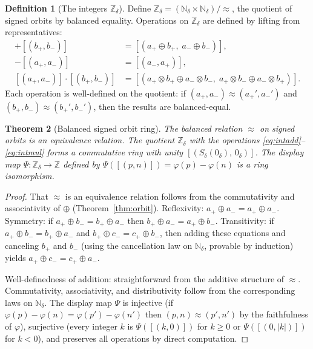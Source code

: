 \documentclass[11pt,a4paper]{article}
\newtheorem{theorem}{Theorem}[section]
\theoremstyle{definition}
\newtheorem{definition}[theorem]{Definition}
\theoremstyle{remark}
\begin{document}
\begin{definition}[The integers $\mathbb{Z}_\delta$]\label{def:prcint}
Define $\mathbb{Z}_\delta = (\mathbb{N}_\delta \times \mathbb{N}_\delta)
/ {\approx}$, the quotient of signed orbits by balanced equality. Operations
on $\mathbb{Z}_\delta$ are defined by lifting from representatives:
\begin{align}
  [(a_+, a_-)] + [(b_+, b_-)] &= [(a_+ \oplus b_+,\; a_- \oplus b_-)],
    \label{eq:intadd} \\
  -[(a_+, a_-)] &= [(a_-, a_+)], \label{eq:intneg} \\
  [(a_+, a_-)] \cdot [(b_+, b_-)] &= [(a_+ \otimes b_+ \oplus a_- \otimes
    b_-,\; a_+ \otimes b_- \oplus a_- \otimes b_+)]. \label{eq:intmul}
\end{align}
Each operation is well-defined on the quotient: if $(a_+, a_-) \approx
(a_+', a_-')$ and $(b_+, b_-) \approx (b_+', b_-')$, then the results are
balanced-equal.
\end{definition}

\begin{theorem}[Balanced signed orbit ring]\label{thm:int}
The balanced relation $\approx$ on signed orbits is an equivalence relation.
The quotient $\mathbb{Z}_\delta$ with the operations
\eqref{eq:intadd}--\eqref{eq:intmul} forms a commutative ring with unity
$[(S_\delta(0_\delta),\, 0_\delta)]$. The display map
$\Psi : \mathbb{Z}_\delta \to \mathbb{Z}$ defined by
$\Psi([(p,n)]) = \varphi(p) - \varphi(n)$ is a ring isomorphism.
\end{theorem}

\begin{proof}
That $\approx$ is an equivalence relation follows from the commutativity and
associativity of $\oplus$ (Theorem~\ref{thm:orbit}). Reflexivity:
$a_+ \oplus a_- = a_+ \oplus a_-$. Symmetry: if
$a_+ \oplus b_- = b_+ \oplus a_-$ then $b_+ \oplus a_- = a_+ \oplus b_-$.
Transitivity: if $a_+ \oplus b_- = b_+ \oplus a_-$ and
$b_+ \oplus c_- = c_+ \oplus b_-$, then adding these equations and canceling
$b_+$ and $b_-$ (using the cancellation law on $\mathbb{N}_\delta$, provable
by induction) yields $a_+ \oplus c_- = c_+ \oplus a_-$.

Well-definedness of addition: straightforward from the additive structure
of $\approx$. Commutativity, associativity, and distributivity follow from
the corresponding laws on $\mathbb{N}_\delta$. The display map $\Psi$ is
injective (if $\varphi(p) - \varphi(n) = \varphi(p') - \varphi(n')$ then
$(p,n) \approx (p',n')$ by the faithfulness of $\varphi$), surjective (every
integer $k$ is $\Psi([(k, 0)])$ for $k \geq 0$ or $\Psi([(0, |k|)])$ for
$k < 0$), and preserves all operations by direct computation.
\end{proof}
\end{document}
